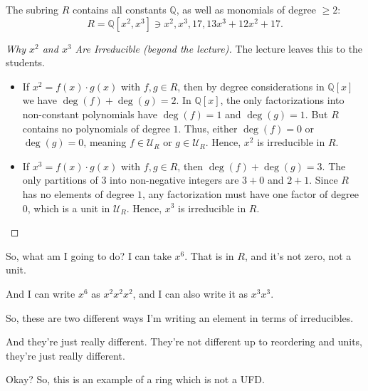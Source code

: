 \begin{content}
The subring $R$ contains all constants $\mathbb{Q}$, as well as monomials of degree $\ge 2$:
\[
R = \mathbb{Q}[x^2, x^3] \ni x^2, x^3, 17, 13x^3 + 12x^2 + 17.
\]


\begin{proof}[Why $x^2$ and $x^3$ Are Irreducible (beyond the lecture)]
The lecture leaves this to the students.
\begin{itemize}
    \item If $x^2 = f(x) \cdot g(x)$ with $f, g \in R$, then by degree considerations in $\mathbb{Q}[x]$ we have $\deg(f) + \deg(g) = 2$. In $\mathbb{Q}[x]$, the only factorizations into non-constant polynomials have $\deg(f) = 1$ and $\deg(g) = 1$. But $R$ contains no polynomials of degree $1$. Thus, either $\deg(f) = 0$ or $\deg(g) = 0$, meaning $f \in \mathcal{U}_R$ or $g \in \mathcal{U}_R$. Hence, $x^2$ is irreducible in $R$.
    \item If $x^3 = f(x) \cdot g(x)$ with $f, g \in R$, then $\deg(f) + \deg(g) = 3$. The only partitions of $3$ into non-negative integers are $3 + 0$ and $2 + 1$. Since $R$ has no elements of degree $1$, any factorization must have one factor of degree $0$, which is a unit in $\mathcal{U}_R$. Hence, $x^3$ is irreducible in $R$.
\end{itemize}
\end{proof}
\end{content}

\begin{speech}[00:26:18 - 00:27:06]
So, what am I going to do? I can take $x^6$.  That is in $R$, and it's not zero, not a unit. 

And I can write $x^6$ as $x^2 x^2 x^2$,  and I can also write it as $x^3 x^3$. 

So, these are two different ways I'm writing an element in terms of irreducibles.

And they're just really different. They're not different up to reordering and units, they're just really different.

Okay? So, this is an example of a ring which is not a UFD.
\end{speech}


